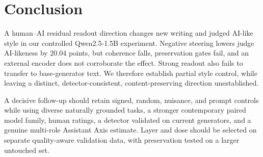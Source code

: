 \section{Conclusion}\label{sec:conclusion}
A human--AI residual readout direction changes new writing and judged AI-like style in our controlled Qwen2.5-1.5B experiment. Negative steering lowers judge AI-likeness by 20.04 points, but coherence falls, preservation gates fail, and an external encoder does not corroborate the effect. Strong readout also fails to transfer to base-generator text. We therefore establish partial style control, while leaving a distinct, detector-consistent, content-preserving direction unestablished.

A decisive follow-up should retain signed, random, nuisance, and prompt controls while using diverse naturally grounded tasks, a stronger contemporary paired model family, human ratings, a detector validated on current generators, and a genuine multi-role Assistant Axis estimate. Layer and dose should be selected on separate quality-aware validation data, with preservation tested on a larger untouched set.
